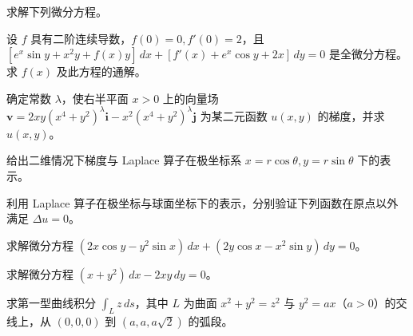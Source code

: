 \noindent\begin{minipage}{\textwidth}
求解下列微分方程。
\end{minipage}\par\vfill
\noindent\begin{minipage}{\textwidth}
设 $f$ 具有二阶连续导数，$f(0)=0,f'(0)=2$，且 $[e^x\sin y+x^2y+f(x)y]\,dx+[f'(x)+e^x\cos y+2x]\,dy=0$ 是全微分方程。求 $f(x)$ 及此方程的通解。
\end{minipage}\par\vfill
\noindent\begin{minipage}{\textwidth}
确定常数 $\lambda$，使右半平面 $x>0$ 上的向量场 $\boldsymbol v=2xy(x^4+y^2)^\lambda\boldsymbol i-x^2(x^4+y^2)^\lambda\boldsymbol j$ 为某二元函数 $u(x,y)$ 的梯度，并求 $u(x,y)$。
\end{minipage}\par\vfill
\newpage
\noindent\begin{minipage}{\textwidth}
给出二维情况下梯度与 Laplace 算子在极坐标系 $x=r\cos\theta,y=r\sin\theta$ 下的表示。
\end{minipage}\par\vfill
\noindent\begin{minipage}{\textwidth}
利用 Laplace 算子在极坐标与球面坐标下的表示，分别验证下列函数在原点以外满足 $\Delta u=0$。
\end{minipage}\par\vfill
\noindent\begin{minipage}{\textwidth}
求解微分方程 $(2x\cos y-y^2\sin x)\,dx+(2y\cos x-x^2\sin y)\,dy=0$。
\end{minipage}\par\vfill
\noindent\begin{minipage}{\textwidth}
求解微分方程 $(x+y^2)\,dx-2xy\,dy=0$。
\end{minipage}\par\vfill
\newpage
\noindent\begin{minipage}{\textwidth}
求第一型曲线积分 $\int_Lz\,ds$，其中 $L$ 为曲面 $x^2+y^2=z^2$ 与 $y^2=ax$（$a>0$）的交线上，从 $(0,0,0)$ 到 $(a,a,a\sqrt2)$ 的弧段。
\end{minipage}\par\vfill
